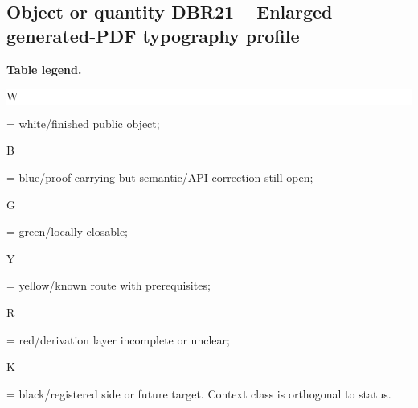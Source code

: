 \subsection*{Object or quantity DBR21 -- Enlarged generated-PDF typography profile}
\hypertarget{objproof:DBR21}{}
\par\smallskip\noindent\begin{minipage}{0.99\linewidth}\footnotesize\raggedright\textbf{Table legend.} \colorbox{white}{\strut W} = white/finished public object; \colorbox{cyan!20}{\strut B} = blue/proof-carrying but semantic/API correction still open; \colorbox{green!18}{\strut G} = green/locally closable; \colorbox{yellow!25}{\strut Y} = yellow/known route with prerequisites; \colorbox{red!20}{\strut R} = red/derivation layer incomplete or unclear; \colorbox{black!18}{\strut K} = black/registered side or future target. Context class is orthogonal to status.\end{minipage}\par\vspace{0.25em}
